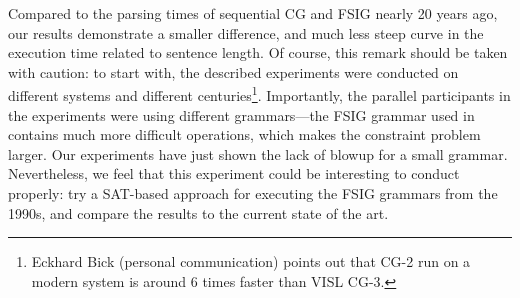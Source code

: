 Compared to the parsing times of sequential CG and FSIG nearly 20 years ago, 
our results demonstrate a smaller difference, and much less steep curve in the execution time
related to sentence length. 
Of course, this remark should be taken with caution: to start with, the described experiments were conducted on different systems and different centuries\footnote{Eckhard Bick (personal communication) points out that CG-2 run on a modern system is around 6 times faster than VISL CG-3.}.
Importantly, the parallel participants in the experiments were using different grammars---the FSIG grammar used in \cite{voutilainen1998} 
contains much more difficult operations, which makes the constraint problem larger. 
Our experiments have just shown the lack of blowup for a small grammar. 
Nevertheless, we feel that this experiment could be interesting to conduct properly: try a SAT-based approach for executing the FSIG grammars from the 1990s, and compare the results to the current state of the art.








